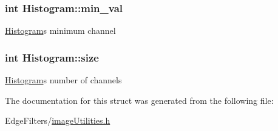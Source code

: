 \subsubsection[{min\+\_\+val}]{\setlength{\rightskip}{0pt plus 5cm}int Histogram\+::min\+\_\+val}\label{struct_histogram_aa635d0511d4e0266b109618ffb261194}
\hyperlink{struct_histogram}{Histogram}\textquotesingle{}s minimum channel \hypertarget{struct_histogram_a9739df0cd7655cb1bbfb4313a499b851}{}
\subsubsection[{size}]{\setlength{\rightskip}{0pt plus 5cm}int Histogram\+::size}\label{struct_histogram_a9739df0cd7655cb1bbfb4313a499b851}
\hyperlink{struct_histogram}{Histogram}\textquotesingle{}s number of channels 

The documentation for this struct was generated from the following file\+:\begin{DoxyCompactItemize}
\item 
Edge\+Filters/\hyperlink{image_utilities_8h}{image\+Utilities.\+h}\end{DoxyCompactItemize}
